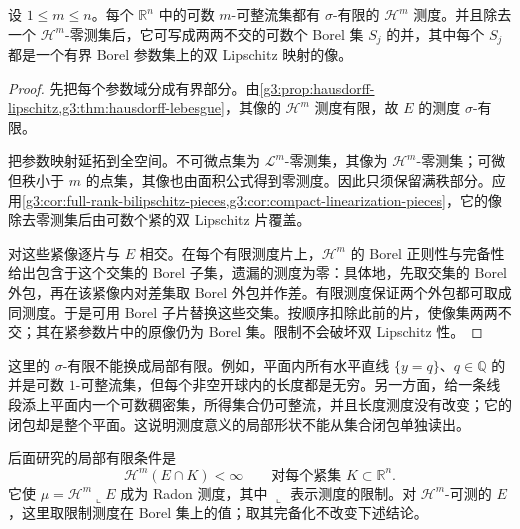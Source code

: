 \begin{proposition}\label{g3:prop:rectifiable-bilipschitz-cover}
	设 \(1\le m\le n\)。每个 \(\mathbb R^n\) 中的可数 \(m\)-可整流集都有 \(\sigma\)-有限的 \(\mathcal H^m\) 测度。并且除去一个 \(\mathcal H^m\)-零测集后，它可写成两两不交的可数个 Borel 集 \(S_j\) 的并，其中每个 \(S_j\) 都是一个有界 Borel 参数集上的双 Lipschitz 映射的像。
\end{proposition}
\begin{proof}
	先把每个参数域分成有界部分。由\cref{g3:prop:hausdorff-lipschitz,g3:thm:hausdorff-lebesgue}，其像的 \(\mathcal H^m\) 测度有限，故 \(E\) 的测度 \(\sigma\)-有限。

	把参数映射延拓到全空间。不可微点集为 \(\mathcal L^m\)-零测集，其像为 \(\mathcal H^m\)-零测集；可微但秩小于 \(m\) 的点集，其像也由面积公式得到零测度。因此只须保留满秩部分。应用\cref{g3:cor:full-rank-bilipschitz-pieces,g3:cor:compact-linearization-pieces}，它的像除去零测集后由可数个紧的双 Lipschitz 片覆盖。

	对这些紧像逐片与 \(E\) 相交。在每个有限测度片上，\(\mathcal H^m\) 的 Borel 正则性与完备性给出包含于这个交集的 Borel 子集，遗漏的测度为零：具体地，先取交集的 Borel 外包，再在该紧像内对差集取 Borel 外包并作差。有限测度保证两个外包都可取成同测度。于是可用 Borel 子片替换这些交集。按顺序扣除此前的片，使像集两两不交；其在紧参数片中的原像仍为 Borel 集。限制不会破坏双 Lipschitz 性。
\end{proof}

这里的 \(\sigma\)-有限不能换成局部有限。例如，平面内所有水平直线 \(\{y=q\}\)、\(q\in\mathbb Q\) 的并是可数 \(1\)-可整流集，但每个非空开球内的长度都是无穷。另一方面，给一条线段添上平面内一个可数稠密集，所得集合仍可整流，并且长度测度没有改变；它的闭包却是整个平面。这说明测度意义的局部形状不能从集合闭包单独读出。

\ProseParagraphBreak
后面研究的局部有限条件是
\[
	\mathcal H^m(E\cap K)<\infty
	\qquad\text{对每个紧集 }K\subset\mathbb R^n.
\]
它使 \(\mu=\mathcal H^m\llcorner E\) 成为 Radon 测度，其中 \(\llcorner\) 表示测度的限制。对 \(\mathcal H^m\)-可测的 \(E\)，这里取限制测度在 Borel 集上的值；取其完备化不改变下述结论。

